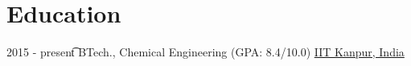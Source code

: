 \documentclass[letterpaper]{twentysecondcv} %
\begin{document}
\makeprofile %

\section{Education}

\begin{twenty} %
	\twentyitem
    	{2015 - present\t}
        {}
        {BTech., Chemical Engineering \textnormal{(GPA: 8.4/10.0)}}
        {\href{http://www.iitk.ac.in/}{IIT Kanpur, India}}
        {}
        {}
\end{twenty}
\end{document}
